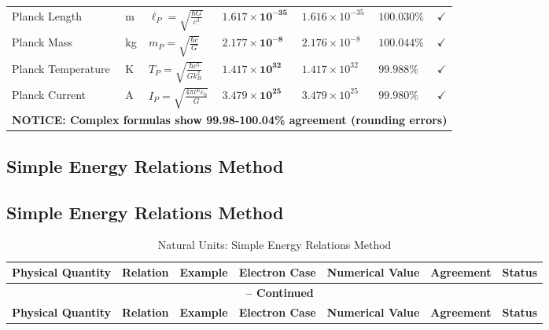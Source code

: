 \documentclass[12pt,a4paper]{article}
\begin{document}
\begin{landscape}
\begin{longtable}{p{4cm}p{1.8cm}p{3.8cm}p{3.2cm}p{3.2cm}p{1.8cm}p{1cm}}
			Planck Length & m & $\ell_P = \sqrt{\frac{\hbar G}{c^3}}$ & $\mathbf{1.617 \times 10^{-35}}$ & $1.616 \times 10^{-35}$ & $\mathbf{100.030\%}$ & $\checkmark$ \\
			
			Planck Mass & kg & $m_P = \sqrt{\frac{\hbar c}{G}}$ & $\mathbf{2.177 \times 10^{-8}}$ & $2.176 \times 10^{-8}$ & $\mathbf{100.044\%}$ & $\checkmark$ \\
			
			Planck Temperature & K & $T_P = \sqrt{\frac{\hbar c^5}{G k_B^2}}$ & $\mathbf{1.417 \times 10^{32}}$ & $1.417 \times 10^{32}$ & $\mathbf{99.988\%}$ & $\checkmark$ \\
			
			Planck Current & A & $I_P = \sqrt{\frac{4\pi c^6 \varepsilon_0}{G}}$ & $\mathbf{3.479 \times 10^{25}}$ & $3.479 \times 10^{25}$ & $\mathbf{99.980\%}$ & $\checkmark$ \\
			
			\multicolumn{7}{l}{\textbf{NOTICE: Complex formulas show 99.98-100.04\% agreement (rounding errors)}} \\
			
		\end{longtable}
		\normalsize

	
	\subsection{Simple Energy Relations Method}
	

		\footnotesize
		
		\normalsize
\newpage	
	\subsection{Simple Energy Relations Method}

		\footnotesize
		\begin{longtable}{p{3.5cm}p{2cm}p{2.5cm}p{4cm}p{3cm}p{1.8cm}p{1cm}}
			\caption{Natural Units: Simple Energy Relations Method} \\
			\toprule
			\textbf{Physical Quantity} & \textbf{Relation} & \textbf{Example} & \textbf{Electron Case} & \textbf{Numerical Value} & \textbf{Agreement} & \textbf{Status} \\
			\midrule
			\endfirsthead
			
			\multicolumn{7}{c}{{\bfseries \tablename\ \thetable{} -- Continued}} \\
			\toprule
			\textbf{Physical Quantity} & \textbf{Relation} & \textbf{Example} & \textbf{Electron Case} & \textbf{Numerical Value} & \textbf{Agreement} & \textbf{Status} \\
			\midrule
			\endhead
			

\end{longtable}
\end{landscape}
\end{document}
